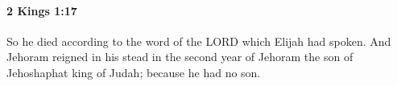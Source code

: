 
		\paragraph{2 Kings 1:17} %
			\label{2KINGS-1-17}

			So he died according to the word of the LORD which Elijah had spoken. And Jehoram reigned in his stead in the second year of Jehoram the son of Jehoshaphat king of Judah; because he had no son.


